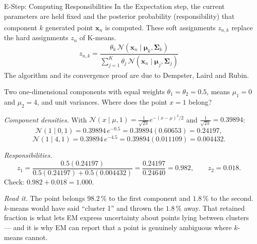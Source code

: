 \begin{v3topic}{E-Step: Computing Responsibilities}
    In the Expectation step, the current parameters are held fixed and the posterior probability (responsibility) that component $k$ generated point $\mathbf{x}_n$ is computed\textsuperscript{\cite[][pp.~175--177]{iiiCourseMachineLearning}}. These soft assignments $z_{n,k}$ replace the hard assignments $z_n$ of K-means.
\visualseparator
    \begin{equation}
        z_{n,k} = \frac{\theta_k \,\mathcal{N}(\mathbf{x}_n \mid \boldsymbol{\mu}_k, \boldsymbol{\Sigma}_k)}
                       {\displaystyle\sum_{j=1}^{K} \theta_j \,\mathcal{N}(\mathbf{x}_n \mid \boldsymbol{\mu}_j, \boldsymbol{\Sigma}_j)}
        \label{eq:ml-em-estep}
    \end{equation}
    The algorithm and its convergence proof are due to Dempster, Laird and
    Rubin\textsuperscript{\cite{dempsterMaximumLikelihoodIncomplete1977}}.

\begin{workedexample}
Two one-dimensional components with equal weights $\theta_1=\theta_2=0.5$,
means $\mu_1 = 0$ and $\mu_2 = 4$, and unit variances. Where does the point
$x = 1$ belong?

\emph{Component densities.} With
$\mathcal{N}(x\mid\mu,1) = \frac{1}{\sqrt{2\pi}}e^{-(x-\mu)^2/2}$ and
$\frac{1}{\sqrt{2\pi}} = 0.39894$:
\[
  \mathcal{N}(1\mid 0,1) = 0.39894\,e^{-0.5} = 0.39894(0.60653) = 0.24197,
\]
\[
  \mathcal{N}(1\mid 4,1) = 0.39894\,e^{-4.5} = 0.39894(0.011109) = 0.004432 .
\]

\emph{Responsibilities.}
\[
  z_{1} = \frac{0.5(0.24197)}{0.5(0.24197)+0.5(0.004432)}
        = \frac{0.24197}{0.24640} = 0.982,
  \qquad z_2 = 0.018 .
\]
Check: $0.982+0.018 = 1.000$. \checkmark

\emph{Read it.} The point belongs $98.2\,\%$ to the first component and
$1.8\,\%$ to the second. $k$-means would have said ``cluster 1'' and thrown the
$1.8\,\%$ away. That retained fraction is what lets EM express uncertainty
about points lying between clusters --- and it is why EM can report that a
point is genuinely ambiguous where $k$-means cannot.
\end{workedexample}

\end{v3topic}
